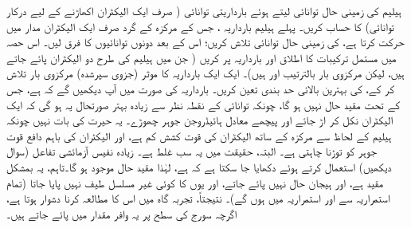 

ہیلیم کی زمینی حال توانائی  لیتے ہوئے بارداریتی توانائی ( صرف ایک الیکٹران اکھاڑنے کے لیے درکار توانائی) کا حساب کریں۔  پہلے ہیلیم بارداریہ ، جس کے مرکزہ کے گرد صرف ایک الیکٹران مدار میں حرکت کرتا ہے، کی زمینی حال توانائی تلاش کریں؛ اس کے بعد دونوں توانائیوں کا فرق لیں۔
اس حصہ میں مستمل ترکیبات کا اطلاق  اور  بارداریہ پر کریں ( جن میں ہیلیم کی طرح دو الیکٹران پائے جاتے ہیں، لیکن مرکزوی بار بالترتیب  اور  ہیں)۔ ایک ایک بارداریہ کا موثر (جزوی سپرشدہ) مرکزوی بار تلاش کر کے،  کی بہترین بالائی حد بندی تعین کریں۔  بارداریہ  کی صورت میں آپ دیکھیں گے کہ  ہے، جس کے تحت مقید حال نہیں ہو گا، چونکہ توانائی کے نقطہ نظر سے زیادہ بہتر صورتحال یہ ہو گی کہ ایک الیکٹران نکل کر اڑ جائے اور پیچھے معادل ہائیڈروجن جوہر چھوڑے۔ یہ حیرت کی بات نہیں چونکہ ہیلیم کے لحاظ سے مرکزہ کے ساتھ الیکٹران کی قوت کشش کم ہے، اور الیکٹران کی باہم دافع قوت جوہر کو توڑنا چاہتی ہے۔ البتہ، حقیقت میں یہ سب غلط ہے۔ زیادہ نفیس آزمائشی تفاعل (سوال  دیکھیں) استعمال کرتے ہوئے دکھایا جا سکتا ہے کہ  ہے، لہٰذا مقید حال موجود ہو گا۔تاہم، یہ بمشکل مقید ہے، اور ہیجان حال نہیں پائے جاتے، اور یوں  کا کوئی غیر مسلسل طیف نہیں پایا جاتا (تمام استمراریہ سے اور استمراریہ میں ہوں گے)۔ نتیجتاً، تجربہ گاہ میں اس کا مطالعہ کرنا دشوار ہوتا ہے، اگرچہ سورج کی سطح پر یہ وافر مقدار میں پائے جاتے ہیں۔

